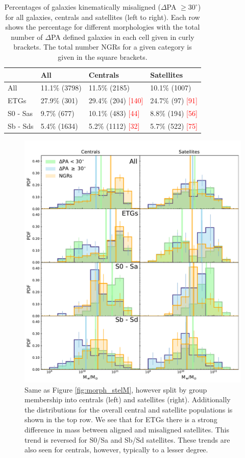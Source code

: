 \documentclass[fleqn,usenatbib]{mnras}
\newcommand{\red}[1]{{\textcolor{red}{#1}}}
\begin{document}
\begin{table}
\begin{tabular}{llll}
\hline
          &           All &      Centrals &    Satellites \\
\hline
      All &  11.1\% (3798) &  11.5\% (2185) &  10.1\% (1007) \\
     ETGs &   27.9\% (301) &   29.4\% (204) \red{[140]} & 24.7\% (97) \red{[91]} \\
 S0 - Sas &    9.7\% (677) &   10.1\% (483) \red{[44]} &    8.8\% (194) \red{[56]} \\
 Sb - Sds &   5.4\% (1634) &   5.2\% (1112) \red{[32]} & 5.7\% (522) \red{[75]} \\
\end{tabular}
\caption{Percentages of galaxies kinematically misaligned ($\Delta$PA $\geq 30^{\circ}$) for all galaxies, centrals and satellites (left to right). Each row shows the percentage for different morphologies with the total number of $\Delta$PA defined galaxies in each cell given in curly brackets. The total number NGRs for a given category is given in the square brackets.}
\label{tab:mega_table}
\end{table}

\begin{figure}
	\includegraphics[width=\linewidth]{cen_sat/delPA_stelM_morph_lim.pdf}
    \caption{Same as Figure \ref{fig:morph_stelM}, however split by group membership into centrals (left) and satellites (right). Additionally the distributions for the overall central and satellite populations is shown in the top row. We see that for ETGs there is a strong difference in mass between aligned and misaligned satellites. This trend is reversed for S0/Sa and Sb/Sd satellites. These trends are also seen for centrals, however, typically to a lesser degree.}
    \label{fig:group_morph_stelM}
\end{figure}
\end{document}
